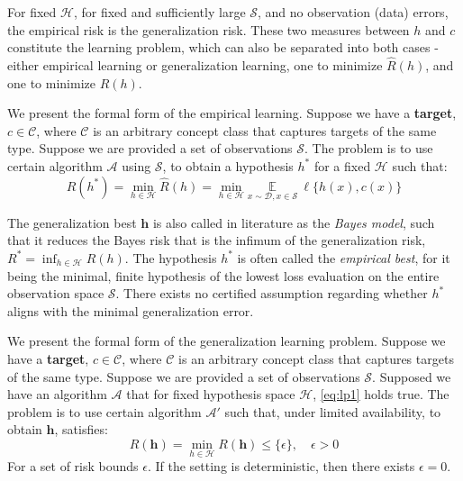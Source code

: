 \documentclass[10pt,oneside,oldfontcommands,dvipsnames,article]{memoir}
\begin{document}
For fixed $\mathcal{H}$, for fixed and sufficiently large $\mathcal{S}$, and no observation (data) errors, the empirical risk is the generalization risk. These two measures between $h$ and $c$ constitute the learning problem, which can also be separated into both cases - either empirical learning or generalization learning, one to minimize $\hat{R}(h)$, and one to minimize $R(h)$. 

\begin{definition}
    We present the formal form of the empirical learning. Suppose we have a \textbf{target}, $c\in\mathcal{C}$, where $\mathcal{C}$ is an arbitrary concept class that captures targets of the same type. Suppose we are provided a set of observations $\mathcal{S}$. The problem is to use certain algorithm $\mathcal{A}$ using $\mathcal{S}$, to obtain a hypothesis $h^{*}$ for a fixed $\mathcal{H}$ such that: 
    \begin{equation}\label{eq:lp1}
        R(h^{*}) = \min_{h\in\mathcal{H}} \hat{R}(h) = \min_{h\in\mathcal{H}} \underset{x\sim\mathcal{D}, x\in \mathcal{S}}{\mathbb{E}}\:\ell\{h(x),c(x)\}
    \end{equation} 
\end{definition}

The generalization best $\bm{h}$ is also called in literature as the \textit{Bayes model}, such that it reduces the Bayes risk that is the infimum of the generalization risk, $R^{*}=\inf_{h\in \mathcal{H}}R(h)$. The hypothesis $h^{*}$ is often called the \textit{empirical best}, for it being the minimal, finite hypothesis of the lowest loss evaluation on the entire observation space $\mathcal{S}$. There exists no certified assumption regarding whether $h^{*}$ aligns with the minimal generalization error.

\begin{definition}
    We present the formal form of the generalization learning problem. Suppose we have a \textbf{target}, $c\in\mathcal{C}$, where $\mathcal{C}$ is an arbitrary concept class that captures targets of the same type. Suppose we are provided a set of observations $\mathcal{S}$. Supposed we have an algorithm $\mathcal{A}$ that for fixed hypothesis space $\mathcal{H}$, \eqref{eq:lp1} holds true. The problem is to use certain algorithm $\mathcal{A}'$ such that, under limited availability, to obtain $\bm{h}$, satisfies: \begin{equation}
        R(\bm{h}) = \min_{h\in \mathcal{H}} R(\bm{h}) \leq \{\epsilon\}, \quad \epsilon > 0 
    \end{equation}
    For a set of risk bounds $\epsilon$. If the setting is deterministic, then there exists $\epsilon=0$. 
\end{definition}
\end{document}
